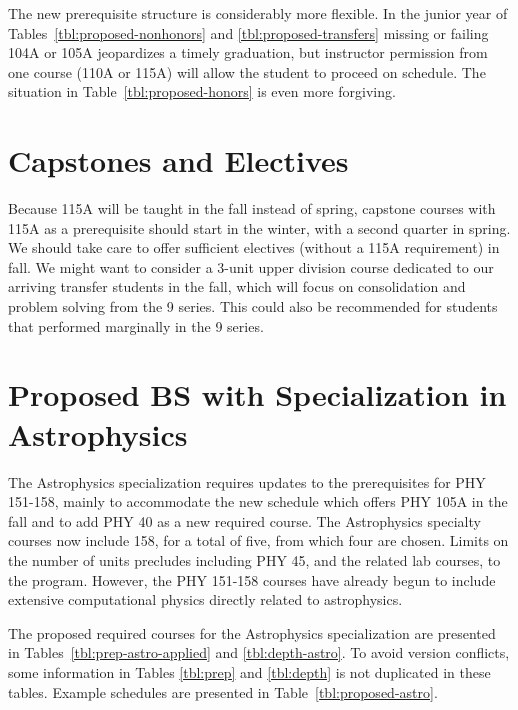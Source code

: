 \documentclass[12pt]{article}
\begin{document}
The new prerequisite structure is considerably more flexible.  In the
junior year of Tables~\ref{tbl:proposed-nonhonors} and
\ref{tbl:proposed-transfers} missing or failing 104A or 105A
jeopardizes a timely graduation, but instructor permission from one
course (110A or 115A) will allow the student to proceed on schedule.
The situation in Table~\ref{tbl:proposed-honors} is even more
forgiving.

\section{Capstones and Electives}

Because 115A will be taught in the fall instead of spring, capstone
courses with 115A as a prerequisite should start in the winter, with a
second quarter in spring.  We should take care to offer sufficient
electives (without a 115A requirement) in fall.  We might want to
consider a 3-unit upper division course dedicated to our arriving
transfer students in the fall, which will focus on consolidation and
problem solving from the 9 series.  This could also be recommended for
students that performed marginally in the 9 series.

\newpage

\section{Proposed BS with Specialization in Astrophysics}
The Astrophysics specialization requires updates to the prerequisites
for PHY 151-158, mainly to accommodate the new schedule which offers
PHY 105A in the fall and to add PHY 40 as a new required course.  The
Astrophysics specialty courses now include 158, for a total of five,
from which four are chosen.  Limits on the number of units precludes
including PHY 45, and the related lab courses, to the program.
However, the PHY 151-158 courses have already begun to include
extensive computational physics directly related to astrophysics.

The proposed required courses for the Astrophysics specialization are presented in
Tables~\ref{tbl:prep-astro-applied} and \ref{tbl:depth-astro}.  To avoid
version conflicts, some information in Tables \ref{tbl:prep} and
\ref{tbl:depth} is not duplicated in these tables.  Example schedules are presented
in Table~\ref{tbl:proposed-astro}.
\end{document}
